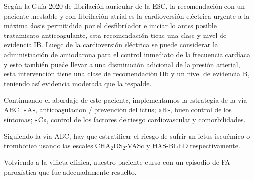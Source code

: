 \documentclass[a4paper]{article}
\let\cite=\supercite
\begin{document}
\begin{multicols}{3}

Según la Guía 2020 de fibrilación auricular de la ESC, la recomendación
con un paciente inestable y con fibrilación atrial es la cardioversión
eléctrica urgente a la máxima dosis permitidida por el
desfibrilador\cite{maxdefib19} e iniciar lo antes posible tratamiento
anticoagulante\cite{guiaesc_2021}, esta recomendación tiene una clase y nivel
de evidencia IB. Luego de la cardioversión eléctrica se puede considerar
la administración de amiodarona para el control inmediato de la frecuencia
cardíaca y esto también puede llevar a una disminución adicional de la
presión arterial\cite{guiaesc_2021}, esta intervención tiene una clase de
recomendación IIb y un nivel de evidencia B, teniendo así evidencia
moderada que la respalde.

Continuando el abordaje de
este paciente, implementamos la estrategia de la vía ABC\cite{lip_abc_2017}.
«A», anticoagulacion / prevención del ictus; «B», buen control de los síntomas;
«C», control de los factores de riesgo cardiovascular y comorbilidades.

Siguiendo la vía ABC, hay que estratificar el riesgo de sufrir un ictus
isquémico o trombótico usando las escales CHA$_{\text{2}}$DS$_{\text{2}}$-VASc
y HAS-BLED respectivamente.

Volviendo a la viñeta clínica, nuestro paciente curso con un episodio de FA
paroxística que fue adecuadamente resuelto.

\closearticle

\printbibliography[heading=none]

\closearticle

\end{multicols}
\end{document}
